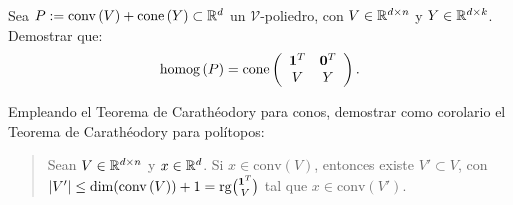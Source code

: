 \documentclass[a4paper,12pt]{article}
\renewcommand{\conv}[1]{\mathrm{conv}\left(#1\right)}
\renewcommand{\cone}[1]{\mathrm{cone}\left(#1\right)}
\newcommand{\homog}[1]{\mathrm{homog}\left(#1\right)}
\newcommand{\VV}{\mathcal{V}}
\begin{document}
\begin{exerciselist}
\item Sea $P:=\conv{V} + \cone{Y} \subset \RR^d$ un $\VV$-poliedro, con $V \in \mathbb{R}^{d \times n}$ y $Y \in \mathbb{R}^{d \times k}$. Demostrar que:
$$
\homog{P}= \cone{
\begin{array}{cc}
  \one^T & \zero^T \\
  V & Y
\end{array}
}.
$$

\item Empleando el Teorema de Carathéodory para conos, demostrar como corolario el Teorema de Carathéodory para polítopos:
\begin{quote}
  Sean $V \in \mathbb{R}^{d \times n}$ y $x \in \mathbb{R}^d$. Si $x \in \conv{V}$, entonces existe $V' \subset V$, con $\card{V'} \leq \dim(\conv{V}) + 1 = \mathrm{rg}{\one^T \choose V}$ tal que $x \in \conv{V'}$.
\end{quote}
\end{exerciselist}
\end{document}
